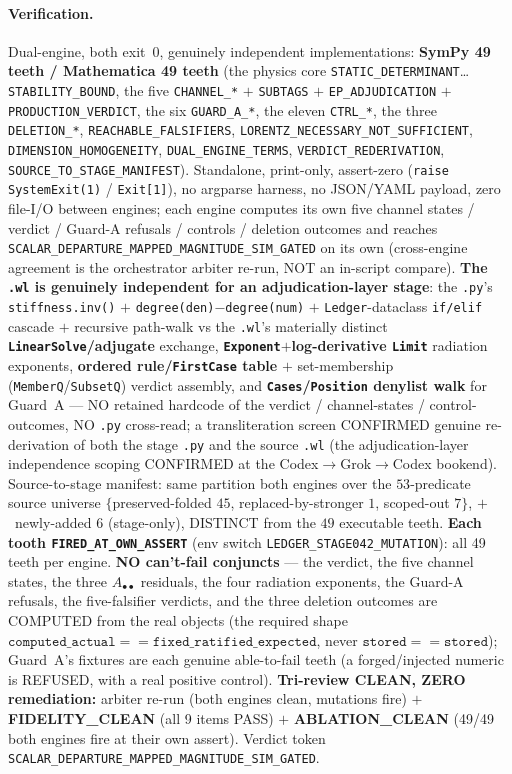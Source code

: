 \paragraph{Verification.}
Dual-engine, both exit~0, genuinely independent implementations:
\textbf{SymPy 49 teeth / Mathematica 49 teeth} (the physics core
\texttt{STATIC\_DETERMINANT}\ldots\texttt{STABILITY\_BOUND}, the five
\texttt{CHANNEL\_*} \(+\) \texttt{SUBTAGS} \(+\) \texttt{EP\_ADJUDICATION} \(+\)
\texttt{PRODUCTION\_VERDICT}, the six \texttt{GUARD\_A\_*}, the eleven
\texttt{CTRL\_*}, the three \texttt{DELETION\_*}, \texttt{REACHABLE\_FALSIFIERS},
\texttt{LORENTZ\_NECESSARY\_NOT\_SUFFICIENT}, \texttt{DIMENSION\_HOMOGENEITY},
\texttt{DUAL\_ENGINE\_TERMS}, \texttt{VERDICT\_REDERIVATION},
\texttt{SOURCE\_TO\_STAGE\_MANIFEST}). Standalone, print-only, assert-zero
(\texttt{raise SystemExit(1)} / \texttt{Exit[1]}), no argparse harness, no
JSON/YAML payload, zero file-I/O between engines; each engine computes its own five
channel states / verdict / Guard-A refusals / controls / deletion outcomes and
reaches \texttt{SCALAR\_DEPARTURE\_MAPPED\_MAGNITUDE\_SIM\_GATED} on its own
(cross-engine agreement is the orchestrator arbiter re-run, NOT an in-script
compare). \textbf{The \texttt{.wl} is genuinely independent for an
adjudication-layer stage}: the \texttt{.py}'s \texttt{stiffness.inv()} \(+\)
\texttt{degree(den)$-$degree(num)} \(+\) \texttt{Ledger}-dataclass
\texttt{if/elif} cascade \(+\) recursive path-walk vs the \texttt{.wl}'s
materially distinct \textbf{\texttt{LinearSolve}/adjugate} exchange,
\textbf{\texttt{Exponent}\(+\)log-derivative \texttt{Limit}} radiation exponents,
\textbf{ordered rule/\texttt{FirstCase} table} \(+\) set-membership
(\texttt{MemberQ}/\texttt{SubsetQ}) verdict assembly, and \textbf{\texttt{Cases}/\texttt{Position}
denylist walk} for Guard~A --- NO retained hardcode of the verdict /
channel-states / control-outcomes, NO \texttt{.py} cross-read; a transliteration
screen CONFIRMED genuine re-derivation of both the stage \texttt{.py} and the
source \texttt{.wl} (the adjudication-layer independence scoping CONFIRMED at the
Codex\(\to\)Grok\(\to\)Codex bookend). Source-to-stage manifest: same partition
both engines over the \(53\)-predicate source universe
\(\{\)preserved-folded \(45\), replaced-by-stronger \(1\), scoped-out \(7\)\(\}\),
\(+\)~newly-added \(6\) (stage-only), DISTINCT from the \(49\) executable teeth.
\textbf{Each tooth \texttt{FIRED\_AT\_OWN\_ASSERT}} (env switch
\texttt{LEDGER\_STAGE042\_MUTATION}): all 49 teeth per engine. \textbf{NO can't-fail
conjuncts} --- the verdict, the five channel states, the three \(A_{\bullet\bullet}\)
residuals, the four radiation exponents, the Guard-A refusals, the five-falsifier
verdicts, and the three deletion outcomes are COMPUTED from the real objects (the
required shape \(\texttt{computed\_actual}==\texttt{fixed\_ratified\_expected}\),
never \(\texttt{stored}==\texttt{stored}\)); Guard~A's fixtures are each genuine
able-to-fail teeth (a forged/injected numeric is REFUSED, with a real positive
control). \textbf{Tri-review CLEAN, ZERO remediation:} arbiter re-run (both engines
clean, mutations fire) \(+\) \textbf{FIDELITY\_CLEAN} (all 9 items PASS) \(+\)
\textbf{ABLATION\_CLEAN} (49/49 both engines fire at their own assert). Verdict
token \texttt{SCALAR\_DEPARTURE\_MAPPED\_MAGNITUDE\_SIM\_GATED}.
